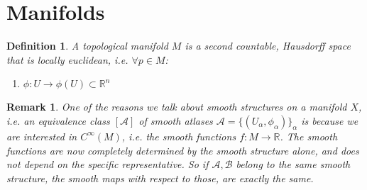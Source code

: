 \documentclass{article}
\numberwithin{theorem}{section}
\newtheorem{definition}[theorem]{Definition}
\newtheorem*{remark}{Remark}
\newcommand{\R}{\mathbb{R}}
\newcommand{\1}{\mathds{1}}
\begin{document}
\tableofcontents 
    
\section{Manifolds }



\begin{definition}
    A topological manifold $M$ is a second countable, Hausdorff space that is locally euclidean, i.e. $\forall p \in M$: 
    \begin{enumerate}
        \item $\phi: U \to \phi(U) \subset \R^n$
    \end{enumerate}
\end{definition}


\begin{remark}
    One of the reasons we talk about smooth structures on a manifold $X$, i.e. an equivalence class $[\mathscr{A}]$ of smooth atlases $\mathscr{A}= \{ (U_\alpha, \phi_\alpha) \}_{\alpha} $ is because we are interested in $C^\infty(M)$, i.e. the smooth functions $f: M \to \R$. The smooth functions are now completely determined by the smooth structure alone, and does not depend on the specific representative. So if $\mathscr{A}, \mathscr{B}$ belong to the same smooth structure, the smooth maps with respect to those, are exactly the same.   
\end{remark}
\end{document}
